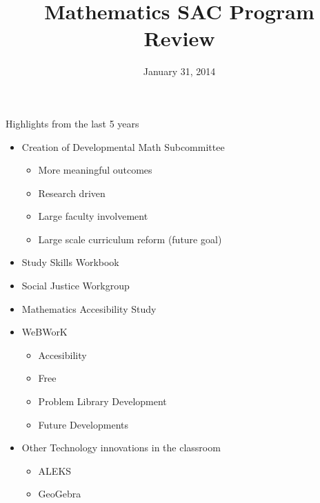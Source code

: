 \documentclass{beamer}
\title{Mathematics SAC Program Review}
\institute{Portland Community College}
\date{January 31, 2014}
\begin{document}
\begin{frame}
\titlepage
\end{frame}


\begin{frame}{Highlights from the last 5 years}

\begin{itemize}

\pause \item Creation of Developmental Math Subcommittee
	\begin{itemize}
	\pause\item More meaningful outcomes
	\pause\item Research driven
	\pause\item Large faculty involvement
	\pause \item Large scale curriculum reform (future goal)
	\end{itemize}

\pause \item Study Skills Workbook
\pause \item Social Justice Workgroup
\pause \item Mathematics Accesibility Study
\pause \item WeBWorK
	\begin{itemize}
	\pause \item Accesibility
	\pause \item Free
	\pause \item Problem Library Development
	\pause \item Future Developments
	\end{itemize}

\pause \item Other Technology innovations in the classroom
	\begin{itemize}
	\pause \item ALEKS
	\pause \item GeoGebra
	\end{itemize}

\end{itemize}
\end{frame}
\end{document}
